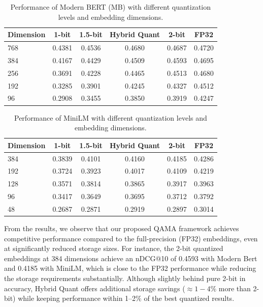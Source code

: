 \begin{table}[ht]
\caption{Performance of Modern BERT (MB) with different quantization levels and embedding dimensions.}
\label{tab:mb_main_results}
\centering
\begin{tabular}{lccccc}
\toprule
\textbf{Dimension} & \textbf{1-bit} & \textbf{1.5-bit} & \textbf{Hybrid Quant} & \textbf{2-bit} & \textbf{FP32} \\
\midrule
768 & 0.4381 & 0.4536 & 0.4680 & 0.4687 & 0.4720 \\
384 & 0.4167 & 0.4429 & 0.4509 & 0.4593 & 0.4695 \\
256 & 0.3691 & 0.4228 & 0.4465 & 0.4513 & 0.4680 \\
192 & 0.3285 & 0.3901 & 0.4245 & 0.4327 & 0.4512 \\
96 & 0.2908 & 0.3455 & 0.3850 & 0.3919 & 0.4247 \\
\bottomrule
\end{tabular}
\end{table}

\begin{table}[ht]
\caption{Performance of MiniLM with different quantization levels and embedding dimensions.}
\label{tab:minilm_main_results}
\centering
\begin{tabular}{lccccc}
\toprule
\textbf{Dimension} & \textbf{1-bit} & \textbf{1.5-bit} & \textbf{Hybrid Quant} & \textbf{2-bit} & \textbf{FP32} \\
\midrule
384 & 0.3839 & 0.4101 & 0.4160 & 0.4185 & 0.4286 \\
192 & 0.3724 & 0.3923 & 0.4017 & 0.4109 & 0.4219 \\
128 & 0.3571 & 0.3814 & 0.3865 & 0.3917 & 0.3963 \\
96 & 0.3417 & 0.3649 & 0.3695 & 0.3712 & 0.3792 \\
48 & 0.2687 & 0.2871 & 0.2919 & 0.2897 & 0.3014 \\
\bottomrule
\end{tabular}
\end{table}

From the results, we observe that our proposed QAMA framework achieves competitive performance compared to the full-precision (FP32) embeddings, even at significantly reduced storage sizes. 
For instance, the 2-bit quantized embeddings at 384 dimensions achieve an nDCG@10 of 0.4593 with Modern Bert and 0.4185 with MiniLM, which is close to the FP32 performance while reducing the storage requirements substantially.
Although slightly behind pure 2-bit in accuracy, Hybrid Quant offers additional storage savings (\(\approx 1{-}4\%\) more than 2-bit) while keeping performance within 1--2\% of the best quantized results. 


